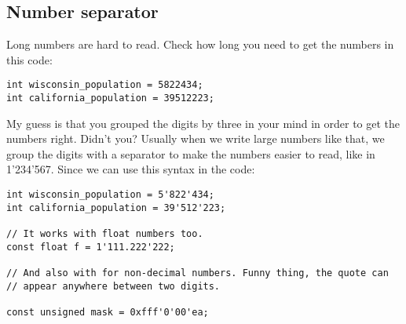 \subsection{Number separator}

Long numbers are hard to read. Check how long you need to get the
numbers in this  code:

\begin{lstlisting}
int wisconsin_population = 5822434;
int california_population = 39512223;
\end{lstlisting}

My guess is that you grouped the digits by three in your mind in order
to get the numbers right. Didn't you? Usually when we write large
numbers like that, we group the digits with a separator to make the
numbers easier to read, like in 1'234'567. Since  we can use
this syntax in the code:

\begin{lstlisting}
int wisconsin_population = 5'822'434;
int california_population = 39'512'223;

// It works with float numbers too.
const float f = 1'111.222'222;

// And also with for non-decimal numbers. Funny thing, the quote can
// appear anywhere between two digits.

const unsigned mask = 0xfff'0'00'ea;
\end{lstlisting}
